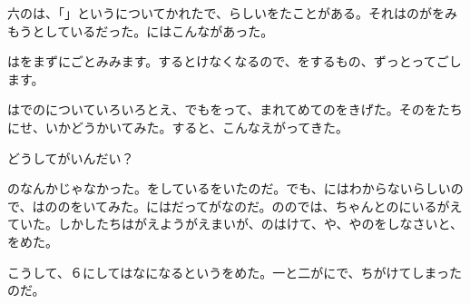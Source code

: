 \documentclass{article}
\begin{document}
\large
\linespread{2.2}
\selectfont
六のは、「」というについてかれたで、らしいをたことがある。それはのがをみもうとしているだった。にはこんながあった。

はをまずにごとみみます。するとけなくなるので、をするもの、ずっとってごします。

はでのについていろいろとえ、でもをって、まれてめてのをきげた。そのをたちにせ、いかどうかいてみた。すると、こんなえがってきた。

どうしてがいんだい？

のなんかじゃなかった。をしているをいたのだ。でも、にはわからないらしいので、はののをいてみた。にはだってがなのだ。ののでは、ちゃんとのにいるがえていた。しかしたちはがえようがえまいが、のはけて、や、やのをしなさいと、をめた。

こうして、６にしてはなになるというをめた。一と二がにで、ちがけてしまったのだ。
\end{document}
